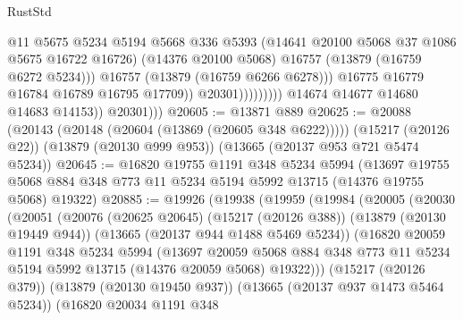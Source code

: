 \begin{lexlean}{RustStd}
\begin{coremodule}
                                        @11
                                        @5675
                                        @5234
                                        @5194
                                        @5668
                                        @336
                                        @5393
                                        (@14641 @20100 @5068 @37 @1086 @5675 @16722 @16726)
                                        (@14376 @20100 @5068)
                                        @16757
                                        (@13879 (@16759 @6272 @5234)))
                                      @16757
                                      (@13879 (@16759 @6266 @6278)))
                                    @16775
                                    @16779
                                    @16784
                                    @16789
                                    @16795
                                    @17709))
                                @20301)))))))))
              @14674
              @14677
              @14680
              @14683
              @14153))
          @20301)))
@20605 := @13871 @889
@20625 := @20088
    (@20143 (@20148 (@20604 (@13869 (@20605 @348 @6222)))))
    (@15217 (@20126 @22))
    (@13879 (@20130 @999 @953))
    (@13665 (@20137 @953 @721 @5474 @5234))
@20645 := @16820
    @19755
    @1191
    @348
    @5234
    @5994
    (@13697 @19755 @5068 @884 @348 @773 @11 @5234 @5194 @5992 @13715 (@14376 @19755 @5068) @19322)
@20885 := @19926
    (@19938
      (@19959
        (@19984
          (@20005
            (@20030
              (@20051
                (@20076
                  (@20625 @20645)
                  (@15217 (@20126 @388))
                  (@13879 (@20130 @19449 @944))
                  (@13665 (@20137 @944 @1488 @5469 @5234))
                  (@16820
                    @20059
                    @1191
                    @348
                    @5234
                    @5994
                    (@13697
                      @20059
                      @5068
                      @884
                      @348
                      @773
                      @11
                      @5234
                      @5194
                      @5992
                      @13715
                      (@14376 @20059 @5068)
                      @19322)))
                (@15217 (@20126 @379))
                (@13879 (@20130 @19450 @937))
                (@13665 (@20137 @937 @1473 @5464 @5234))
                (@16820
                  @20034
                  @1191
                  @348

\end{coremodule}
\end{lexlean}
